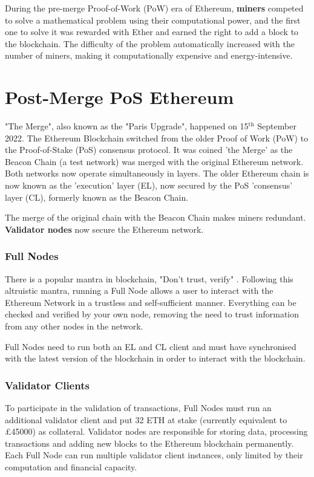 During the pre-merge Proof-of-Work (PoW) era of Ethereum, \textbf{miners} competed to solve a mathematical problem using their computational power, and the first one to solve it was rewarded with Ether and earned the right to add a block to the blockchain. The difficulty of the problem automatically increased with the number of miners, making it computationally expensive and energy-intensive. 


\section{Post-Merge PoS Ethereum}

"The Merge", also known as the "Paris Upgrade", happened on 15$\mathrm{^{th}}$ September 2022. The Ethereum Blockchain switched from the older Proof of Work (PoW) to the Proof-of-Stake (PoS) consensus protocol. It was coined 'the Merge' as the Beacon Chain (a test network) was merged with the original Ethereum network. Both networks now operate simultaneously in layers. The older Ethereum chain is now known as the 'execution' layer (EL), now secured by the PoS 'consensus' layer (CL), formerly known as the Beacon Chain. 

The merge of the original chain with the Beacon Chain makes miners redundant. \textbf{Validator nodes} now secure the Ethereum network. 

\subsubsection{Full Nodes}
There is a popular mantra in blockchain, "Don't trust, verify" \cite{EthereumEthereum.org}. Following this altruistic mantra, running a Full Node allows a user to interact with the Ethereum Network in a trustless and self-sufficient manner. Everything can be checked and verified by your own node, removing the need to trust information from any other nodes in the network. 

Full Nodes need to run both an EL and CL client and must have  synchronised with the latest version of the blockchain in order to interact with the blockchain. 

\subsubsection{Validator Clients}
\label{ValidatorsLitRev}
To participate in the validation of transactions, Full Nodes must run an additional validator client and put 32 ETH at stake (currently equivalent to £45000) as collateral. Validator nodes are responsible for storing data, processing transactions and adding new blocks to the Ethereum blockchain permanently. Each Full Node can run multiple validator client instances, only limited by their computation and financial capacity.

